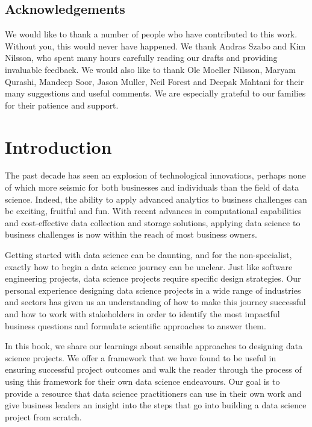 \documentclass[
]{book}
\begin{document}
\hypertarget{acknowledgements}{%
\section*{Acknowledgements}\label{acknowledgements}}

We would like to thank a number of people who have contributed to this work. Without you, this would never have happened. We thank Andras Szabo and Kim Nilsson, who spent many hours carefully reading our drafts and providing invaluable feedback. We would also like to thank Ole Moeller Nilsson, Maryam Qurashi, Mandeep Soor, Jason Muller, Neil Forest and Deepak Mahtani for their many suggestions and useful comments. We are especially grateful to our families for their patience and support.

\hypertarget{introduction}{%
\chapter{Introduction}\label{introduction}}

The past decade has seen an explosion of technological innovations, perhaps none of which more seismic for both businesses and individuals than the field of data science. Indeed, the ability to apply advanced analytics to business challenges can be exciting, fruitful and fun. With recent advances in computational capabilities and cost-effective data collection and storage solutions, applying data science to business challenges is now within the reach of most business owners.

Getting started with data science can be daunting, and for the non-specialist, exactly how to begin a data science journey can be unclear. Just like software engineering projects, data science projects require specific design strategies. Our personal experience designing data science projects in a wide range of industries and sectors has given us an understanding of how to make this journey successful and how to work with stakeholders in order to identify the most impactful business questions and formulate scientific approaches to answer them.

In this book, we share our learnings about sensible approaches to designing data science projects. We offer a framework that we have found to be useful in ensuring successful project outcomes and walk the reader through the process of using this framework for their own data science endeavours. Our goal is to provide a resource that data science practitioners can use in their own work and give business leaders an insight into the steps that go into building a data science project from scratch.
\end{document}
